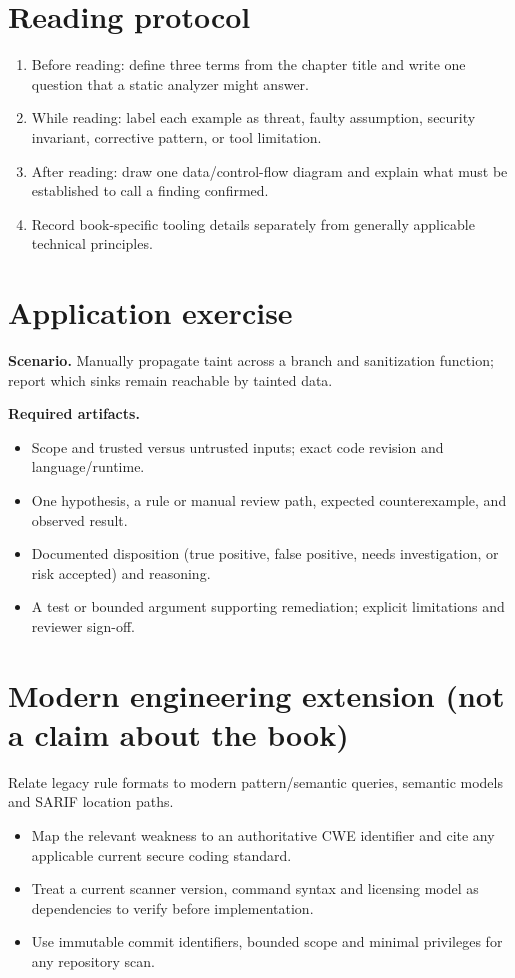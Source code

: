 \documentclass[10pt,letterpaper]{article}
\begin{document}
\section{Reading protocol}
\begin{enumerate}
\item Before reading: define three terms from the chapter title and write one question that a static analyzer might answer.
\item While reading: label each example as threat, faulty assumption, security invariant, corrective pattern, or tool limitation.
\item After reading: draw one data/control-flow diagram and explain what must be established to call a finding confirmed.
\item Record book-specific tooling details separately from generally applicable technical principles.
\end{enumerate}

\section{Application exercise}
\textbf{Scenario.} Manually propagate taint across a branch and sanitization function; report which sinks remain reachable by tainted data.

\textbf{Required artifacts.}\begin{itemize}
\item Scope and trusted versus untrusted inputs; exact code revision and language/runtime.
\item One hypothesis, a rule or manual review path, expected counterexample, and observed result.
\item Documented disposition (true positive, false positive, needs investigation, or risk accepted) and reasoning.
\item A test or bounded argument supporting remediation; explicit limitations and reviewer sign-off.
\end{itemize}

\section{Modern engineering extension (not a claim about the book)}
Relate legacy rule formats to modern pattern/semantic queries, semantic models and SARIF location paths.

\begin{itemize}
\item Map the relevant weakness to an authoritative CWE identifier and cite any applicable current secure coding standard.
\item Treat a current scanner version, command syntax and licensing model as dependencies to verify before implementation.
\item Use immutable commit identifiers, bounded scope and minimal privileges for any repository scan.
\end{itemize}
\end{document}
